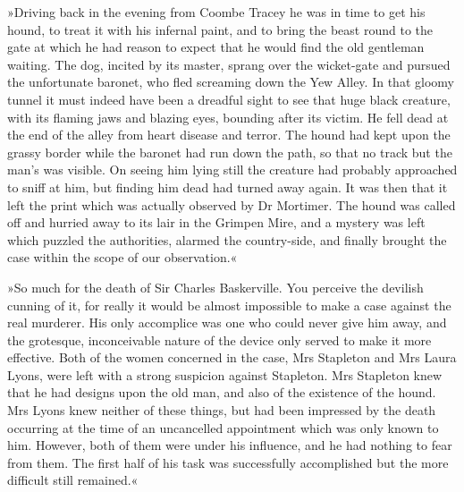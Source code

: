 »Driving back in the evening from Coombe Tracey he was in time to get his hound, to treat it with his infernal paint, and to bring the beast round to the gate at which he had reason to expect that he would find the old gentleman waiting. The dog, incited by its master, sprang over the wicket-gate and pursued the unfortunate baronet, who fled screaming down the Yew Alley. In that gloomy tunnel it must indeed have been a dreadful sight to see that huge black creature, with its flaming jaws and blazing eyes, bounding after its victim. He fell dead at the end of the alley from heart disease and terror. The hound had kept upon the grassy border while the baronet had run down the path, so that no track but the man's was visible. On seeing him lying still the creature had probably approached to sniff at him, but finding him dead had turned away again. It was then that it left the print which was actually observed by Dr Mortimer. The hound was called off and hurried away to its lair in the Grimpen Mire, and a mystery was left which puzzled the authorities, alarmed the country-side, and finally brought the case within the scope of our observation.«

»So much for the death of Sir Charles Baskerville. You perceive the devilish cunning of it, for really it would be almost impossible to make a case against the real murderer. His only accomplice was one who could never give him away, and the grotesque, inconceivable nature of the device only served to make it more effective. Both of the women concerned in the case, Mrs Stapleton and Mrs Laura Lyons, were left with a strong suspicion against Stapleton. Mrs Stapleton knew that he had designs upon the old man, and also of the existence of the hound. Mrs Lyons knew neither of these things, but had been impressed by the death occurring at the time of an uncancelled appointment which was only known to him. However, both of them were under his influence, and he had nothing to fear from them. The first half of his task was successfully accomplished but the more difficult still remained.«

